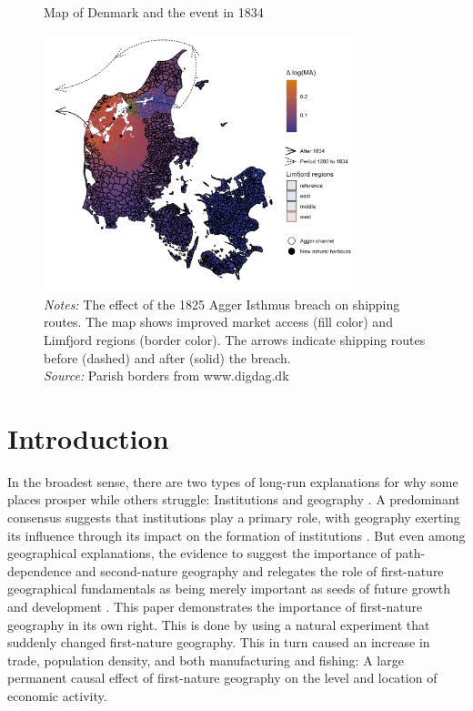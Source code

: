 \documentclass[11pt]{article}
\begin{document}
\begin{figure}[h]
\centering
\caption{Map of Denmark and the event in 1834}
\includegraphics[width=0.8\textwidth]{Plots/Map_manual_edits.png}
\parbox{0.9\textwidth}{
\caption*{\footnotesize \textit{Notes:} The effect of the 1825 Agger Isthmus breach on shipping routes. The map shows improved market access (fill color) and Limfjord regions (border color). The arrows indicate shipping routes before (dashed) and after (solid) the breach. \\ \textit{Source:} Parish borders from www.digdag.dk}
}
\label{fig:main_map}
\end{figure}

\section{Introduction}
In the broadest sense, there are two types of long-run explanations for why some places prosper while others struggle: Institutions \citep{rodrik2004institutions} and geography \citep{Henderson2018satelite}. A predominant consensus suggests that institutions play a primary role, with geography exerting its influence through its impact on the formation of institutions \citep{Acemoglu2001, rodrik2004institutions, Easterly2003, Ketterer2018}. But even among geographical explanations, the evidence to suggest the importance of path-dependence and second-nature geography \citep{Krugman1991, Bleakley2012, Ager2020a} and relegates the role of first-nature geographical fundamentals as being merely important as seeds of future growth and development \citep{Davis2002, Bosker2017, Allen2023}. This paper demonstrates the importance of first-nature geography in its own right. This is done by using a natural experiment that suddenly changed first-nature geography. This in turn caused an increase in trade, population density, and both manufacturing and fishing: A large permanent causal effect of first-nature geography on the level and location of economic activity.  
\end{document}
